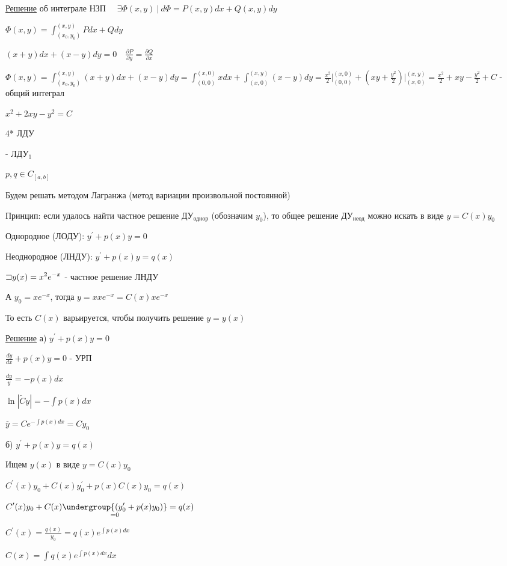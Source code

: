 \documentclass[12pt]{article}
\begin{document}
    \vspace{5mm}

    \underline{Решение} \Mems \Ths об интеграле НЗП $\quad \exists \Phi(x, y)\ | \ d\Phi = P(x, y)dx + Q(x, y)dy$

    $\displaystyle \Phi(x, y) = \int^{(x,y)}_{(x_0,y_0)} Pdx + Qdy$

    \Ex $\displaystyle (x + y)dx + (x - y)dy = 0 \quad \frac{\partial P}{\partial y} = \frac{\partial Q}{\partial x}$

    $\displaystyle \Phi(x, y) = \int^{(x, y)}_{(x_0,y_0)} (x + y)dx + (x - y)dy =
    \int^{(x,0)}_{(0,0)} xdx + \int^{(x,y)}_{(x,0)} (x - y)dy = \frac{x^2}{2} \Big|_{(0, 0)}^{(x, 0)} +
    (xy + \frac{y^2}{2}) \Big|_{(x, 0)}^{(x, y)} = \frac{x^2}{2} + xy - \frac{y^2}{2} + C$ - общий интеграл

    $\displaystyle x^2 + 2xy - y^2 = C$

    4* ЛДУ

    \Def {} - ЛДУ$\displaystyle _1$

    $\displaystyle p, q \in C_{[a, b]}$

    \Nota Будем решать методом Лагранжа (метод вариации произвольной постоянной)

    Принцип: если удалось найти частное решение ДУ$\displaystyle _\text{однор}$ (обозначим $\displaystyle y_0$), то общее решение ДУ$\displaystyle _\text{неод}$
    можно искать в виде $\displaystyle y = C(x)y_0$

    \Def Однородное (ЛОДУ): $\displaystyle y^\prime + p(x)y = 0$

    \Def Неоднородное (ЛНДУ): $\displaystyle y^\prime + p(x)y = q(x)$

    \Ex $\displaystyle \mathord{\sqsupset} y(x) = x^2 e^{-x}$ - частное решение ЛНДУ

    А $\displaystyle y_0 = x e^{-x}$, тогда $\displaystyle y = x xe^{-x} = C(x) x e^{-x}$

    То есть $C(x)$ варьируется, чтобы получить решение $y = y(x)$

    \underline{Решение} а) $\displaystyle y^\prime + p(x)y = 0$

    $\displaystyle \frac{dy}{dx} + p(x)y = 0$ - УРП

    $\displaystyle \frac{dy}{y} = -p(x)dx$

    $\displaystyle \ln|\tilde{C}y| = -\int p(x)dx$

    $\displaystyle \overline{y} = Ce^{-\int p(x) dx} = Cy_0$

    б) $\displaystyle y^\prime + p(x)y = q(x)$

    Ищем $y(x)$ в виде $\displaystyle y = C(x)y_0$

    $\displaystyle C^\prime(x)y_0 + C(x)y^\prime_0 + p(x)C(x)y_0 = q(x)$

    $\displaystyle C^\prime(x)y_0 + C(x)\underset{=0}{\undergroup{(y^\prime_0 + p(x)y_0)}} = q(x)$

    $\displaystyle C^\prime(x) = \frac{q(x)}{y_0} = q(x)e^{\int p(x)dx}$

    $\displaystyle C(x) = \int q(x) e^{\int p(x)dx} dx$
\end{document}

